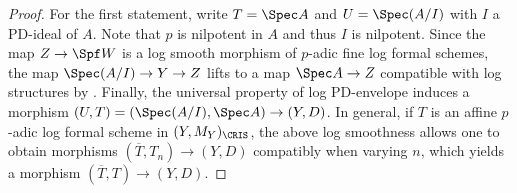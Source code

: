 \begin{proof}
For the first statement, write $T=\Spec A$ and $U=\Spec(A/I)$ with $I$ a PD-ideal of $A$. Note that $p$ is nilpotent in $A$ and thus $I$ is nilpotent. Since the map $Z\rightarrow \Spf W$ is a log smooth morphism of $p$-adic fine log formal schemes, the map $\Spec (A/I)\rightarrow Y\rightarrow Z$ lifts to a map $\Spec A\rightarrow Z$ compatible with log structures by \cite[Prop.~IV.3.1.4.2]{Ogus-log}. Finally, the universal property of log PD-envelope induces a morphism $(U,T)=(\Spec (A/I), \Spec A)\rightarrow (Y,D)$. In general, if $T$ is an affine $p$-adic log formal scheme in $(Y,M_Y)_\CRIS$, the above log smoothness allows one to obtain morphisms $(\overline{T},T_n)\rightarrow (Y,D)$ compatibly when varying $n$, which yields a morphism $(\overline{T},T)\rightarrow (Y,D)$.
\end{proof}

